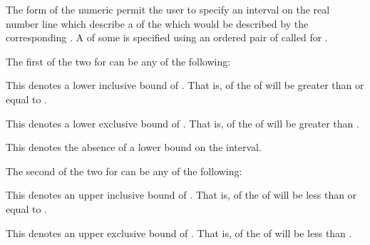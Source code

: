 \endsubsubsection%

\endsubsection%


The  form of the numeric 
permit the user to specify an interval on the real number line
which describe a  of the  which would be described by the
corresponding .  A  of some 
 is specified using an ordered pair of  called
 for  .

The first of the two  for   can be
any of the following:

\beginlist


This denotes a lower inclusive bound of .  That is, 
of the  of  will be greater than or equal to .


This denotes a lower exclusive bound of .  That is, 
of the  of  will be greater than .


This denotes the absence of a lower bound on the interval.

\endlist

The second of the two  for   can be
any of the following:

\beginlist


This denotes an upper inclusive bound of .  That is, 
of the  of  will be less than or equal to .


This denotes an upper exclusive bound of .  That is, 
of the  of  will be less than .

